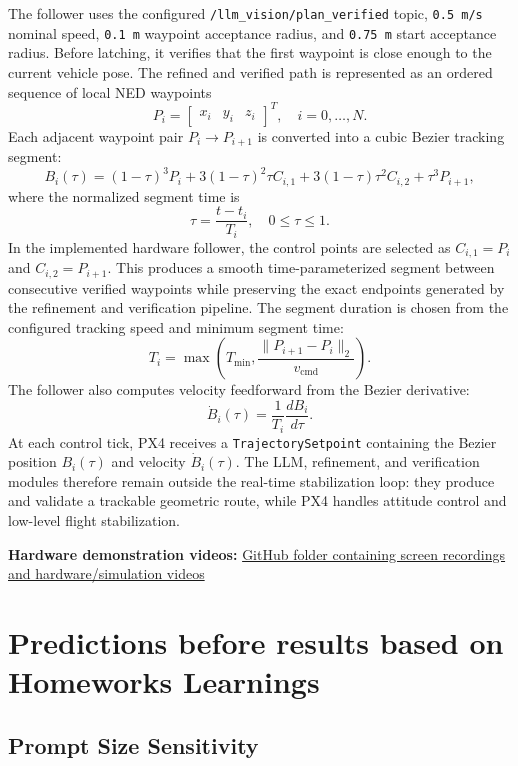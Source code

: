 \documentclass[11pt]{article}
\begin{document}
The follower uses the configured \texttt{/llm\_vision/plan\_verified} topic, \texttt{0.5 m/s} nominal speed, \texttt{0.1 m} waypoint acceptance radius, and \texttt{0.75 m} start acceptance radius. Before latching, it verifies that the first waypoint is close enough to the current vehicle pose. The refined and verified path is represented as an ordered sequence of local NED waypoints
\[
P_i =
\begin{bmatrix}
x_i & y_i & z_i
\end{bmatrix}^{T},
\quad i = 0,\ldots,N.
\]
Each adjacent waypoint pair \(P_i \rightarrow P_{i+1}\) is converted into a cubic Bezier tracking segment:
\[
B_i(\tau) =
(1-\tau)^3P_i
+ 3(1-\tau)^2\tau C_{i,1}
+ 3(1-\tau)\tau^2 C_{i,2}
+ \tau^3P_{i+1},
\]
where the normalized segment time is
\[
\tau = \frac{t - t_i}{T_i}, \quad 0 \leq \tau \leq 1.
\]
In the implemented hardware follower, the control points are selected as \(C_{i,1}=P_i\) and \(C_{i,2}=P_{i+1}\). This produces a smooth time-parameterized segment between consecutive verified waypoints while preserving the exact endpoints generated by the refinement and verification pipeline. The segment duration is chosen from the configured tracking speed and minimum segment time:
\[
T_i = \max\left(T_{\min}, \frac{\|P_{i+1}-P_i\|_2}{v_{\mathrm{cmd}}}\right).
\]
The follower also computes velocity feedforward from the Bezier derivative:
\[
\dot{B}_i(\tau)=\frac{1}{T_i}\frac{dB_i}{d\tau}.
\]
At each control tick, PX4 receives a \texttt{TrajectorySetpoint} containing the Bezier position \(B_i(\tau)\) and velocity \(\dot{B}_i(\tau)\). The LLM, refinement, and verification modules therefore remain outside the real-time stabilization loop: they produce and validate a trackable geometric route, while PX4 handles attitude control and low-level flight stabilization.


\begin{center}
\textbf{Hardware demonstration videos:} 
\href{https://github.com/prachitgupta/starling_testing_ws/tree/main/src/starling_testing/flight_logs/test_run_videos}{GitHub folder containing screen recordings and hardware/simulation videos}
\end{center}

\section{Predictions before results based on Homeworks Learnings}

\subsection{Prompt Size Sensitivity}
\end{document}
